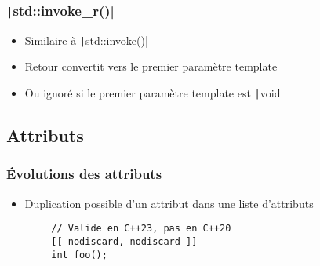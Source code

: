 \documentclass[C++.tex]{subfiles}
\begin{document}
\begin{frame}[fragile]
	\frametitle{\texttt|std::invoke_r()|}
	\begin{itemize}
		\item Similaire à \texttt|std::invoke()|
		\item Retour convertit vers le premier paramètre template
		\item Ou ignoré si le premier paramètre template est \texttt|void|
	\end{itemize}


\end{frame}

\subsection*{Attributs}
\begin{frame}[fragile]
	\frametitle{Évolutions des attributs}
	\begin{itemize}
		\item Duplication possible d'un attribut dans une liste d'attributs
	\end{itemize}

	\begin{verbatim}
		// Valide en C++23, pas en C++20
		[[ nodiscard, nodiscard ]]
		int foo();
	\end{verbatim}

\end{frame}
\end{document}
